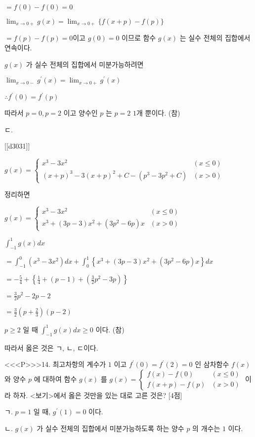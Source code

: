 \documentclass{oblivoir}
\begin{document}
$=f(0)-f(0)=0$

$\lim _{x \rightarrow 0+} g(x)=\lim _{x \rightarrow 0+}\{f(x+p)-f(p)\}$

$=f(p)-f(p)=0$이고 $g(0)=0$ 이므로 함수 $g(x)$ 는 실수 전체의 집합에서 연속이다.

$g(x)$ 가 실수 전체의 집합에서 미분가능하려면

$\lim _{x \rightarrow 0-} g^{\prime}(x)=\lim _{x \rightarrow 0+} g^{\prime}(x)$

$\therefore f^{\prime}(0)=f^{\prime}(p)$

따라서 $p=0, p=2$ 이고 양수인 $p$ 는 $p=2$ $1$개 뿐이다. (참)

ㄷ.

[[d3031]]

$g(x)= \begin{cases}x^{3}-3 x^{2} & (x \leq 0)\\ (x+p)^{3}-3(x+p)^{2}+C-\left(p^{3}-3 p^{2}+C\right) &(x>0)\end{cases}$

정리하면

$g(x)=\begin{cases}
x^{3}-3 x^{2} & (x \leq 0)\\
x^{3}+(3 p-3) x^{2}+\left(3 p^{2}-6 p\right) x & (x>0)
\end{cases}$

$\int_{-1}^{1} g(x) d x$

$=\int_{-1}^{0}\left(x^{3}-3 x^{2}\right)dx+\int_{0}^{1}\left\{x^{3}+(3 p-3) x^{2}+\left(3 p^{2}-6 p\right) x\right\} d x$

$=-\frac{5}{4}+\left\{\frac{1}{4}+(p-1)+\left(\frac{3}{2} p^{2}-3 p\right)\right\}$

$=\frac{3}{2} p^{2}-2 p-2$

$=\frac{3}{2}\left(p+\frac{2}{3}\right)(p-2)$

$p \geq 2 $ 일 때 $\int_{-1}^{1} g(x) d x \geq 0 $ 이다. (참)

따라서 옳은 것은 ㄱ, ㄴ, ㄷ이다.


<<<P>>>14. 최고차항의 계수가 $1$ 이고 $f^{\prime}(0)=f^{\prime}(2)=0$ 인 삼차함수 $f(x)$ 와 양수 $p$ 에 대하여 함수 $g(x)$ 를
$g(x)= \begin{cases}f(x)-f(0) & (x \leq 0) \\ f(x+p)-f(p) & (x>0)\end{cases}$
이라 하자. <보기>에서 옳은 것만을 있는 대로 고른 것은? [4점]

ㄱ. $p=1$ 일 때, $g^{\prime}(1)=0$ 이다.

ㄴ. $g(x)$ 가 실수 전체의 집합에서 미분가능하도록 하는 양수 $p$ 의 개수는 $1$ 이다.
\end{document}
